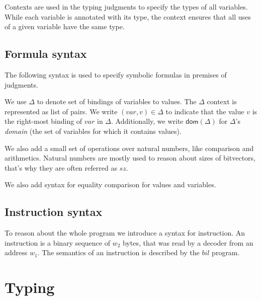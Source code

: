 \documentclass[11pt]{article}
\begin{document}
Contexts are used in the typing judgments to specify the types of all
variables. While each variable is annotated with its type, the context
ensures that all uses of a given variable have the same type.

\ottgrammartabular{
\ottgamma\ottinterrule
}

\subsection{Formula syntax}
\label{sec:formula}

The following syntax is used to specify symbolic formulas in premises
of judgments.

We use $\Delta$ to denote set of bindings of variables to values. The
$\Delta$ context is represented as list of pairs. We write
$(var,v) \in \Delta$ to indicate that the value $v$ is the right-most
binding of $var$ in $\Delta$.  Additionally, we write
$\mathsf{dom}(\Delta)$ for $\Delta$'s {\em domain} (the set of
variables for which it contains values).

We also add a small set of operations over natural numbers, like
comparison and arithmetics. Natural numbers are mostly used to reason
about sizes of bitvectors, that's why they are often referred as
$\mathit{sz}$.

We also add syntax for equality comparison for values and variables.


\ottgrammartabular{
\ottdelta\ottinterrule
}

\ottgrammartabular{
\ottformula\ottinterrule
}

\ottgrammartabular{
\ottnat\ottinterrule
}

\subsection{Instruction syntax}
\label{sec:insn}

To reason about the whole program we introduce a syntax for
instruction. An instruction is a binary sequence of $\mathit{w_2}$
bytes, that was read by a decoder from an address $\mathit{w_1}$. The
semantics of an instruction is described by the $\mathit{bil}$ program.

\ottgrammartabular{
\ottinsn\ottinterrule
}

\clearpage

\section{Typing}
\label{sec:typing}
\end{document}
